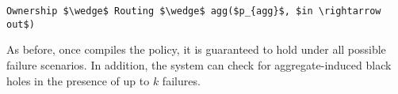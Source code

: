 \begin{lstlisting}[mathescape=true]
Ownership $\wedge$ Routing $\wedge$ agg($p_{agg}$, $in \rightarrow out$)
\end{lstlisting}

As before, once \sysname compiles the policy, it is guaranteed to hold under
all possible failure scenarios. In addition, the system can check for
aggregate-induced black holes in the presence of up to $k$ failures.









%
%
%
%
%
%
